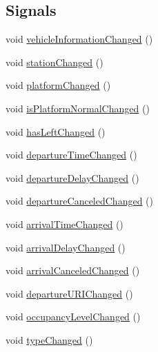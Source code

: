 \subsection*{Signals}
\begin{DoxyCompactItemize}
\item 
void \mbox{\hyperlink{classCSA_1_1VehicleStop_ae7a43ee3fc70d2359ff12de44b38e6d2}{vehicle\+Information\+Changed}} ()
\item 
void \mbox{\hyperlink{classCSA_1_1VehicleStop_a8cee8183966bb993b1dcc3ca26a483a9}{station\+Changed}} ()
\item 
void \mbox{\hyperlink{classCSA_1_1VehicleStop_a827783ce6df243615d065d5ec49605a6}{platform\+Changed}} ()
\item 
void \mbox{\hyperlink{classCSA_1_1VehicleStop_adbe85cb67383f19a9330160046adf8ab}{is\+Platform\+Normal\+Changed}} ()
\item 
void \mbox{\hyperlink{classCSA_1_1VehicleStop_a009c43f5a3c905a7dcce7b164b75bba4}{has\+Left\+Changed}} ()
\item 
void \mbox{\hyperlink{classCSA_1_1VehicleStop_a0bf965ffe19e1bb16ed3fce5031f56ed}{departure\+Time\+Changed}} ()
\item 
void \mbox{\hyperlink{classCSA_1_1VehicleStop_afba5878d8d99cb87db9d5ce549c2e429}{departure\+Delay\+Changed}} ()
\item 
void \mbox{\hyperlink{classCSA_1_1VehicleStop_a85491b7004511491a9782b6f2bd1155f}{departure\+Canceled\+Changed}} ()
\item 
void \mbox{\hyperlink{classCSA_1_1VehicleStop_ae9f705db514276be05baa892241f797d}{arrival\+Time\+Changed}} ()
\item 
void \mbox{\hyperlink{classCSA_1_1VehicleStop_a371e833cad3ce70195dae5e6917043ee}{arrival\+Delay\+Changed}} ()
\item 
void \mbox{\hyperlink{classCSA_1_1VehicleStop_ad5de2913078d75e0445652cb3e688dc7}{arrival\+Canceled\+Changed}} ()
\item 
void \mbox{\hyperlink{classCSA_1_1VehicleStop_a201e105bb8c1afc2e149c414298c7f52}{departure\+U\+R\+I\+Changed}} ()
\item 
void \mbox{\hyperlink{classCSA_1_1VehicleStop_ae0e96512e3c84393e7d7e641d3163baa}{occupancy\+Level\+Changed}} ()
\item 
void \mbox{\hyperlink{classCSA_1_1VehicleStop_a8a5cffb45c9ea23129662d91fff26385}{type\+Changed}} ()
\end{DoxyCompactItemize}

